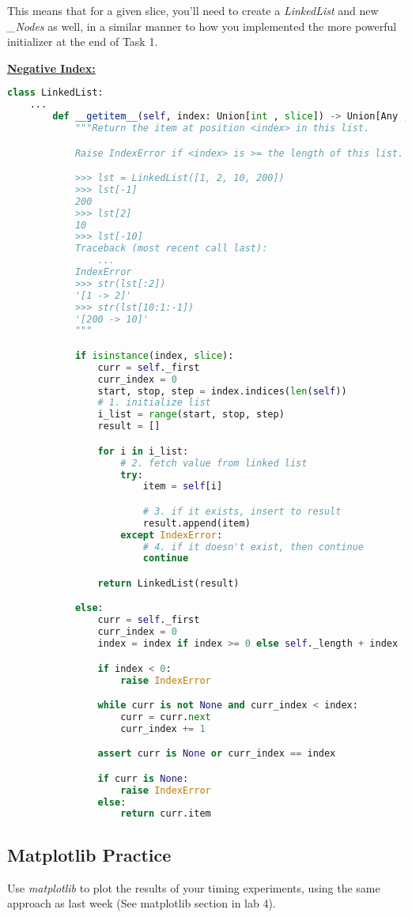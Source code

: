 \documentclass[12pt]{article}
\begin{document}
\bigskip

\noindent This means that for a given slice, you’ll need to create a \textit{LinkedList} and new
\textit{\_Nodes} as well, in a similar manner to how you implemented the more
powerful initializer at the end of Task 1.

\bigskip

\begin{mdframed}

\underline{\textbf{Negative Index:}}

\begin{lstlisting}[language=python]
    class LinkedList:
    ...
        def __getitem__(self, index: Union[int , slice]) -> Union[Any , LinkedList]:
            """Return the item at position <index> in this list.

            Raise IndexError if <index> is >= the length of this list.

            >>> lst = LinkedList([1, 2, 10, 200])
            >>> lst[-1]
            200
            >>> lst[2]
            10
            >>> lst[-10]
            Traceback (most recent call last):
                ...
            IndexError
            >>> str(lst[:2])
            '[1 -> 2]'
            >>> str(lst[10:1:-1])
            '[200 -> 10]'
            """

            if isinstance(index, slice):
                curr = self._first
                curr_index = 0
                start, stop, step = index.indices(len(self))
                # 1. initialize list
                i_list = range(start, stop, step)
                result = []

                for i in i_list:
                    # 2. fetch value from linked list
                    try:
                        item = self[i]

                        # 3. if it exists, insert to result
                        result.append(item)
                    except IndexError:
                        # 4. if it doesn't exist, then continue
                        continue

                return LinkedList(result)

            else:
                curr = self._first
                curr_index = 0
                index = index if index >= 0 else self._length + index

                if index < 0:
                    raise IndexError

                while curr is not None and curr_index < index:
                    curr = curr.next
                    curr_index += 1

                assert curr is None or curr_index == index

                if curr is None:
                    raise IndexError
                else:
                    return curr.item

\end{lstlisting}
\end{mdframed}


\subsection*{Matplotlib Practice}
Use \textit{matplotlib} to plot the results of your timing experiments, using the same
approach as last week (See matplotlib section in lab 4).
\end{document}
